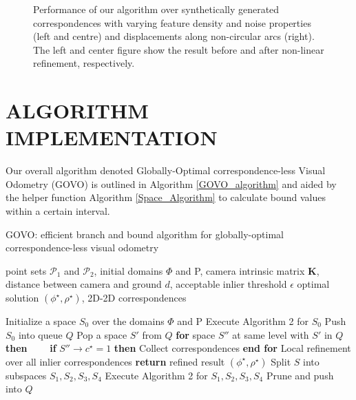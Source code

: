 \documentclass[letterpaper, 10 pt, conference]{ieeeconf}  %
\begin{document}
\begin{figure*}[t]
  \vspace{0.2cm}
  \centering
  \caption{Performance of our algorithm over synthetically generated correspondences with varying feature density and noise properties (left and centre) and displacements along non-circular arcs (right). The left and center figure show the result before and after non-linear refinement, respectively.}
  \label{fig:simulation}
\end{figure*}

\section{ALGORITHM IMPLEMENTATION}
\label{sec:algorithm}

Our overall algorithm denoted Globally-Optimal correspondence-less Visual Odometry (GOVO) is outlined in Algorithm \ref{GOVO_algorithm} and aided by the helper function Algorithm \ref{Space_Algorithm} to calculate bound values within a certain interval.

\begin{algorithm}
	\caption{GOVO: efficient branch and bound algorithm for globally-optimal correspondence-less visual odometry}
	\begin{algorithmic}[1]
		\Require point sets $\mathcal{P}_1$ and $\mathcal{P}_2$, initial domains $\Phi$ and P, camera intrinsic matrix $\textbf{K}$, distance between camera and ground $d$, acceptable inlier threshold $\epsilon$
		\Ensure optimal solution $(\phi^{\star}, \rho^{\star})$, 2D-2D correspondences
		
		\State Initialize a space $S_0$ over the domains $\Phi$ and P
		\State Execute Algorithm 2 for $S_0$
		\State Push $S_0$ into queue $Q$
		\Loop
			\State Pop a space $S'$ from $Q$
				\State \textbf{for} space $S''$ at same level with $S'$ in $Q$ \textbf{then}
					\State \ \ \ \ \textbf{if} {$S'' \rightarrow c^{\star} = 1$} \textbf{then} Collect correspondences
				\State \textbf{end for}
				\State Local refinement over all inlier correspondences
				\State \textbf{return} refined result $(\phi^{\star}, \rho^{\star})$
			\Else
				\State Split $S$ into subspaces ${S_{1}, S_{2}, S_{3}, S_{4}}$
				\State Execute Algorithm 2 for ${S_{1}, S_{2}, S_{3}, S_{4}}$
				\State Prune and push into $Q$
			\EndIf
		\EndLoop
	\end{algorithmic}
	\label{GOVO_algorithm}
\end{algorithm}
\end{document}
